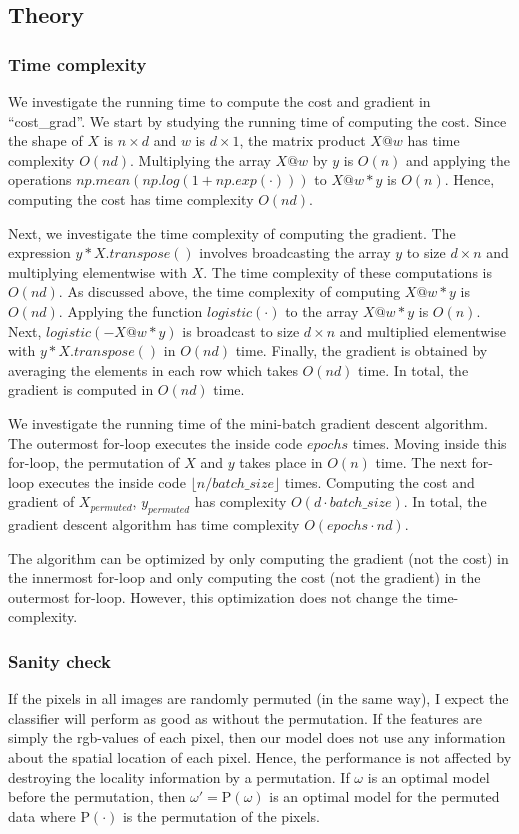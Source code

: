 \documentclass{article}
\begin{document}
\subsection*{Theory}
	\subsubsection*{Time complexity}
	We investigate the running time to compute the cost and gradient in ``cost\_grad''.
	We start by studying the running time of computing the cost.
	Since the shape of $X$ is $n\times d$ and $w$ is $d \times 1$, the matrix product $X @ w$ has time complexity $O(nd)$.
	Multiplying the array $X @ w$ by $y$ is $O(n)$ and applying the operations $np.mean(np.log(1 + np.exp(\cdot)))$ to $X @ w * y$ is $O(n)$.
	Hence, computing the cost has time complexity $O(nd)$.

	Next, we investigate the time complexity of computing the gradient.
	The expression $y*X.transpose()$ involves broadcasting the array $y$ to size $d \times n$ and multiplying elementwise with $X$. 
	The time complexity of these computations is $O(nd)$.
	As discussed above, the time complexity of computing $X @ w * y$ is $O(nd)$.
	Applying the function $logistic(\cdot)$ to the array $X @ w * y$ is $O(n)$.
	Next, $logistic(-X @ w * y)$ is broadcast to size $d \times n$ and multiplied elementwise with $y * X.transpose()$ in $O(nd)$ time.
	Finally, the gradient is obtained by averaging the elements in each row which takes $O(nd)$ time.
	In total, the gradient is computed in $O(nd)$ time.
	
	We investigate the running time of the mini-batch gradient descent algorithm.
	The outermost for-loop executes the inside code $epochs$ times.
	Moving inside this for-loop, the permutation of $X$ and $y$ takes place in $O(n)$ time.
	The next for-loop executes the inside code $\lfloor n/batch\_size \rfloor$ times.
	Computing the cost and gradient of $X_{permuted}$, $y_{permuted}$ has complexity $O(d\cdot batch\_size)$.
	In total, the gradient descent algorithm has time complexity $O(epochs\cdot n d)$.
	
	The algorithm can be optimized by only computing the gradient (not the cost) in the innermost for-loop and only computing the cost (not the gradient) in the outermost for-loop. 
	However, this optimization does not change the time-complexity. 
	
	\subsubsection*{Sanity check}
	If the pixels in all images are randomly permuted (in the same way), I expect the classifier will perform as good as without the permutation.
	If the features are simply the rgb-values of each pixel, then our model does not use any information about the spatial location of each pixel. Hence, the performance is not affected by destroying the locality information by a permutation.
	If $\omega$ is an optimal model before the permutation, then $\omega' = \mathrm{P}(\omega)$ is an optimal model for the permuted data where $\mathrm{P}(\cdot)$ is the permutation of the pixels.
	
\end{document}
